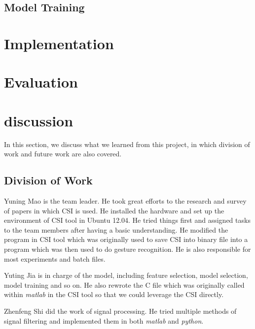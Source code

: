 \documentclass[conference]{IEEEtran}
\begin{document}
\subsection{Model Training}

\section{Implementation} \label{section-implementation}

\section{Evaluation} \label{section-evaluation}


\section{discussion} \label{section-discussion}

In this section, we discuss what we learned from this project, in which division of work and future work are also covered.

\subsection{Division of Work}
Yuning Mao is the team leader. He took great efforts to the research and survey of papers in which CSI is used. He installed the hardware and set up the environment of CSI tool in Ubuntu 12.04. He tried things first and assigned tasks to the team members after having a basic understanding. He modified the program in CSI tool which was originally used to save CSI into binary file into a program which was then used to do gesture recognition. He is also responsible for most experiments and batch files.

Yuting Jia is in charge of the model, including feature selection, model selection, model training and so on. He also rewrote the C file which was originally called within \emph{matlab} in the CSI tool so that we could leverage the CSI directly.

Zhenfeng Shi did the work of signal processing. He tried multiple methods of signal filtering and implemented them in both \emph{matlab} and \emph{python}.
\end{document}
